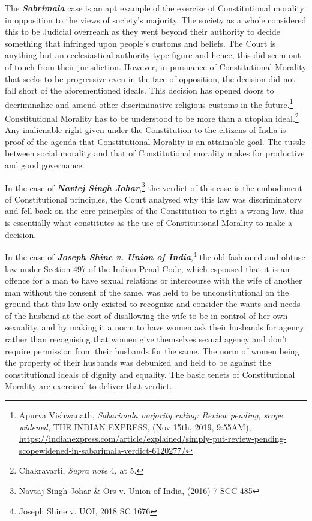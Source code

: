 \begin{multicols}{2}
\noi
The \textbf{\textit{Sabrimala}} case is an apt example of the exercise of Constitutional morality in opposition
to the views of society’s majority. The society as a whole considered this to be Judicial
overreach as they went beyond their authority to decide something that infringed upon
people’s customs and beliefs. The Court is anything but an ecclesiastical authority type figure
and hence, this did seem out of touch from their jurisdiction. However, in pursuance of
Constitutional Morality that seeks to be progressive even in the face of opposition, the 
decision did not fall short of the aforementioned ideals. This decision has opened doors to
decriminalize and amend other discriminative religious customs in the future.\footnote{ Apurva Vishwanath, \textit{Sabarimala majority ruling: Review pending, scope widened,} THE INDIAN EXPRESS,
(Nov 15th, 2019, 9:55AM),  \url{https://indianexpress.com/article/explained/simply-put-review-pending-scopewidened-in-sabarimala-verdict-6120277/}} Constitutional Morality has to be understood to be more than a utopian ideal.\footnote{Chakravarti, \textit{Supra note} 4, at 5.} Any inalienable right given under the Constitution to the citizens of India is proof of the agenda that Constitutional
Morality is an attainable goal. The tussle between social morality and that of Constitutional
morality makes for productive and good governance.

\noi
In the case of \textbf{\textit{Navtej Singh Johar}},\footnote{Navtaj Singh Johar \& Ors v. Union of India, (2016) 7 SCC 485} the verdict of this case is the embodiment of
Constitutional principles, the Court analysed why this law was discriminatory and fell back
on the core principles of the Constitution to right a wrong law, this is essentially what
constitutes as the use of Constitutional Morality to make a decision.

\noi
In the case of \textbf{\textit{Joseph Shine v. Union of India}},\footnote{Joseph Shine v. UOI, 2018 SC 1676} the old-fashioned and obtuse law under
Section 497 of the Indian Penal Code, which espoused that it is an offence for a man to have
sexual relations or intercourse with the wife of another man without the consent of the same,
was held to be unconstitutional on the ground that this law only existed to recognize and
consider the wants and needs of the husband at the cost of disallowing the wife to be in
control of her own sexuality, and by making it a norm to have women ask their husbands for
agency rather than recognising that women give themselves sexual agency and don’t require
permission from their husbands for the same. The norm of women being the property of their
husbands was debunked and held to be against the constitutional ideals of dignity and
equality. The basic tenets of Constitutional Morality are exercised to deliver that verdict.


\end{multicols}
